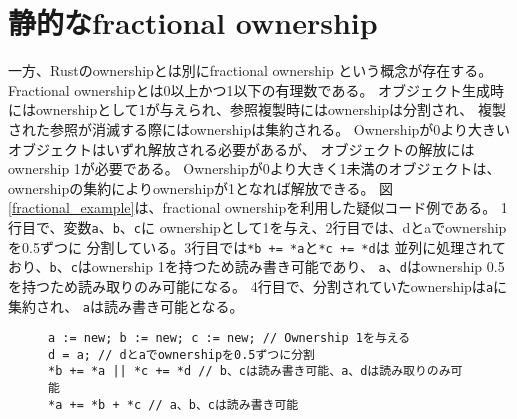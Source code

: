 \documentclass{sumiilab-paper}
\theoremstyle{mystyle}
\numberwithin{definition}{chapter} %
\begin{document}
\afterpage{\clearpage}
\newpage
\section{静的なfractional ownership}
一方、Rustのownershipとは別にfractional ownership\cite{DBLP:conf/sas/Boyland03}
という概念が存在する。
Fractional ownershipとは0以上かつ1以下の有理数である。
オブジェクト生成時にはownershipとして1が与えられ、参照複製時にはownershipは分割され、
複製された参照が消滅する際にはownershipは集約される。
Ownershipが0より大きいオブジェクトはいずれ解放される必要があるが、
オブジェクトの解放にはownership 1が必要である。
Ownershipが0より大きく1未満のオブジェクトは、
ownershipの集約によりownershipが1となれば解放できる。
図\ref{fractional_example}は、fractional ownershipを利用した疑似コード例である。
1行目で、変数\texttt{a}、\texttt{b}、\texttt{c}に
ownershipとして1を与え、2行目では、dとaでownershipを0.5ずつに
分割している。3行目では\texttt{*b += *a}と\texttt{*c += *d}は
並列に処理されており、\texttt{b}、\texttt{c}はownership 1を持つため読み書き可能であり、
\texttt{a}、\texttt{d}はownership 0.5を持つため読み取りのみ可能になる。
4行目で、分割されていたownershipは\texttt{a}に集約され、
\texttt{a}は読み書き可能となる。
\begin{figure}[htp]
\begin{lstlisting}[caption=Fractional ownershipの利用例, label=fractional_example, captionpos=b]
a := new; b := new; c := new; // Ownership 1を与える
d = a; // dとaでownershipを0.5ずつに分割
*b += *a || *c += *d // b、cは読み書き可能、a、dは読み取りのみ可能
*a += *b + *c // a、b、cは読み書き可能
\end{lstlisting}
\end{figure}
\end{document}
